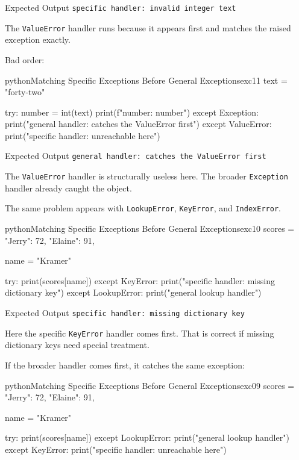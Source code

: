 \begin{iobox}{Expected Output}
\texttt{specific handler: invalid integer text} \\
\end{iobox}


The \texttt{ValueError} handler runs because it appears first and matches the raised exception exactly.

Bad order:

\begin{codebox}[]{python}{Matching Specific Exceptions Before General Exceptions}{exc11}
text = "forty-two"

try:
    number = int(text)
    print(f"number: {number}")
except Exception:
    print("general handler: catches the ValueError first")
except ValueError:
    print("specific handler: unreachable here")
\end{codebox}


\begin{iobox}{Expected Output}
\texttt{general handler: catches the ValueError first} \\
\end{iobox}


The \texttt{ValueError} handler is structurally useless here. The broader \texttt{Exception} handler already caught the object.

The same problem appears with \texttt{LookupError}, \texttt{KeyError}, and \texttt{IndexError}.

\begin{codebox}[]{python}{Matching Specific Exceptions Before General Exceptions}{exc10}
scores = {
    "Jerry": 72,
    "Elaine": 91,
}

name = "Kramer"

try:
    print(scores[name])
except KeyError:
    print("specific handler: missing dictionary key")
except LookupError:
    print("general lookup handler")
\end{codebox}


\begin{iobox}{Expected Output}
\texttt{specific handler: missing dictionary key} \\
\end{iobox}


Here the specific \texttt{KeyError} handler comes first. That is correct if missing dictionary keys need special treatment.

If the broader handler comes first, it catches the same exception:

\begin{codebox}[]{python}{Matching Specific Exceptions Before General Exceptions}{exc09}
scores = {
    "Jerry": 72,
    "Elaine": 91,
}

name = "Kramer"

try:
    print(scores[name])
except LookupError:
    print("general lookup handler")
except KeyError:
    print("specific handler: unreachable here")
\end{codebox}


